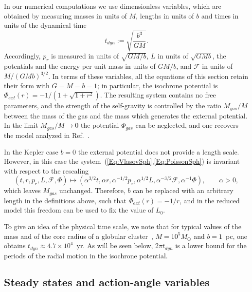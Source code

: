 In our numerical computations we use dimensionless variables, which are obtained by measuring masses in units of $M$, lengths in units of $b$ and times in units of the dynamical time
\begin{equation}
t_{dyn} := \sqrt{\frac{b^3}{GM}}.
\label{Eq:tdyn}
\end{equation}
Accordingly, $p_r$ is measured in units of $\sqrt{GM/b}$, $L$ in units of $\sqrt{GMb}$, the potentials and the energy per unit mass in units of $GM/b$, and $\mathcal{F}$ in units of $M/(GMb)^{3/2}$. In terms of these variables, all the equations of this section retain their form with $G = M = b = 1$; in particular, the isochrone potential is $\Phi_{ext}(r) = -1/(1 + \sqrt{1 + r^2})$. The resulting system contains no free parameters, and the strength of the self-gravity is controlled by the ratio $M_{gas}/M$ between the mass of the gas and the mass which generates the external potential. In the limit $M_{gas}/M\to 0$ the potential $\Phi_{gas}$ can be neglected, and one recovers the model analyzed in Ref.~\cite{pRoS20}.

In the Kepler case $b = 0$ the external potential does not provide a length scale. However, in this case the system~(\ref{Eq:VlasovSph},\ref{Eq:PoissonSph}) is invariant with respect to the rescaling
\begin{equation}
(t,r,p_r,L,\mathcal{F},\Phi)\mapsto \left( \alpha^{3/2} t,\alpha r,\alpha^{-1/2} p_r,\alpha^{1/2} L,\alpha^{-3/2}\mathcal{F},\alpha^{-1}\Phi \right),\qquad \alpha > 0,
\label{Eq:Rescaling}
\end{equation}
which leaves $M_{gas}$ unchanged. Therefore, $b$ can be replaced with an arbitrary length in the definitions above, such that $\Phi_{ext}(r) = -1/r$, and in the reduced model this freedom can be used to fix the value of $L_0$.

To give an idea of the physical time scale, we note that for typical values of the mass and of the core radius of a globular cluster~\cite{BinneyTremaine-Book}, $M = 10^5 M_\odot$ and $b = 1$~pc, one obtains $t_{dyn}\approx 4.7\times 10^4$~yr. As will be seen below, $2\pi t_{dyn}$ is a lower bound for the periods of the radial motion in the isochrone potential.


\subsection{Steady states and action-angle variables}
\label{SubSec:AA}

